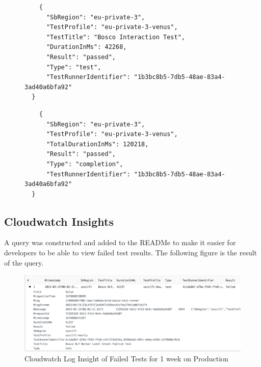 \documentclass[12pt,a4paper,titlepage]{report}
\begin{document}
\begin{figure}[H]
  \begin{tcolorbox}
   \begin{verbatim}
    {
      "SbRegion": "eu-private-3",
      "TestProfile": "eu-private-3-venus",
      "TestTitle": "Bosco Interaction Test",
      "DurationInMs": 42268,
      "Result": "passed",
      "Type": "test",
      "TestRunnerIdentifier": "1b3bc8b5-7db5-48ae-83a4-3ad40a6bfa92"
  }
 \end{verbatim}
 \end{tcolorbox}
 \end{figure}

 \begin{figure}[H]
  \begin{tcolorbox}
   \begin{verbatim}
    {
      "SbRegion": "eu-private-3",
      "TestProfile": "eu-private-3-venus",
      "TotalDurationInMs": 120218,
      "Result": "passed",
      "Type": "completion",
      "TestRunnerIdentifier": "1b3bc8b5-7db5-48ae-83a4-3ad40a6bfa92"
  }
 \end{verbatim}
 \end{tcolorbox}
 \end{figure}

 \subsection{Cloudwatch Insights}
 A query was constructed and added to the READMe to make it easier for developers to be able to view failed test results.
 The following figure is the result of the query. 
 \begin{figure}[ht]
  \centering
  \includegraphics[width=\textwidth,height=\textheight,keepaspectratio]{./diagrams/insights.png}
  \caption{Cloudwatch Log Insight of Failed Tests for 1 week on Production}
 \end{figure}
\end{document}

